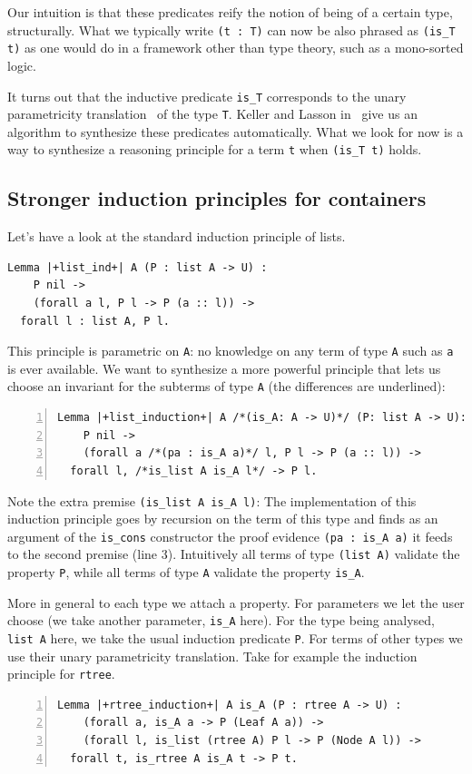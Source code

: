\documentclass[a4paper,UKenglish,cleveref, autoref]{lipics-v2019}
\begin{document}
Our intuition is that these predicates reify the notion of being
of a certain type, structurally. What we typically write \lstinline+(t : T)+
can now be also phrased as \lstinline+(is_T t)+ as one would do in a
framework other than type theory, such as a mono-sorted logic.

It turns out that the inductive predicate \lstinline+is_T+ corresponds
to the unary parametricity translation~\cite{Wadler:1989:TF:99370.99404}
of the type \lstinline+T+.
Keller and Lasson in~\cite{keller:hal-00730913} give us an
algorithm to synthesize these predicates automatically.
What we look for now is a way to synthesize
a reasoning principle for a term \lstinline+t+ when 
\lstinline+(is_T t)+ holds.

\subsection{Stronger induction principles for containers} %

Let's have a look at the standard induction principle of lists.
\begin{lstlisting}
Lemma |+list_ind+| A (P : list A -> U) :
    P nil ->
    (forall a l, P l -> P (a :: l)) ->
  forall l : list A, P l.
\end{lstlisting}

\noindent
This principle is parametric on \lstinline+A+:
no knowledge on any term of type \lstinline+A+ such as \lstinline+a+ is
ever available.
We want to synthesize a more powerful principle that lets us choose
an invariant for the subterms of type \lstinline+A+
(the differences are underlined):
\begin{lstlisting}[numbers=left]
Lemma |+list_induction+| A /*(is_A: A -> U)*/ (P: list A -> U):
    P nil ->
    (forall a /*(pa : is_A a)*/ l, P l -> P (a :: l)) ->
  forall l, /*is_list A is_A l*/ -> P l.
\end{lstlisting}

\noindent
Note the extra premise \lstinline+(is_list A is_A l)+: The
implementation of this induction principle
goes by recursion on the term of this type and finds
as an argument of the \lstinline+is_cons+ constructor
the proof evidence \lstinline+(pa : is_A a)+ it feeds to the second premise
(line 3). Intuitively all terms of type \lstinline+(list A)+
validate the property \lstinline+P+, while all terms of type
\lstinline+A+ validate the property \lstinline+is_A+.

More in general to each type we attach a property. For parameters we
let the user choose (we take another parameter, \lstinline+is_A+ here).
For the type being analysed, \lstinline+list A+ here, we take the
usual induction predicate \lstinline+P+.
For terms of other types we use their unary parametricity translation.
Take for example the induction principle for \lstinline+rtree+.
\begin{lstlisting}[numbers=left]
Lemma |+rtree_induction+| A is_A (P : rtree A -> U) :
    (forall a, is_A a -> P (Leaf A a)) ->
    (forall l, is_list (rtree A) P l -> P (Node A l)) ->
  forall t, is_rtree A is_A t -> P t.
\end{lstlisting}
\end{document}
